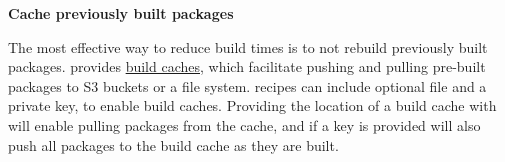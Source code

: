 \noindent\textbf{Cache previously built packages}

The most effective way to reduce build times is to not rebuild previously built packages.
\spack provides \href{https://spack.readthedocs.io/en/latest/binary_caches.html}{build caches}, which facilitate pushing and pulling pre-built packages to S3 buckets or a file system.
\stackinator recipes can include optional  file and a private key, to enable build caches.
Providing the location of a build cache with  will enable pulling packages from the cache, and if a key is provided \stackinator will also push all packages to the build cache as they are built.


